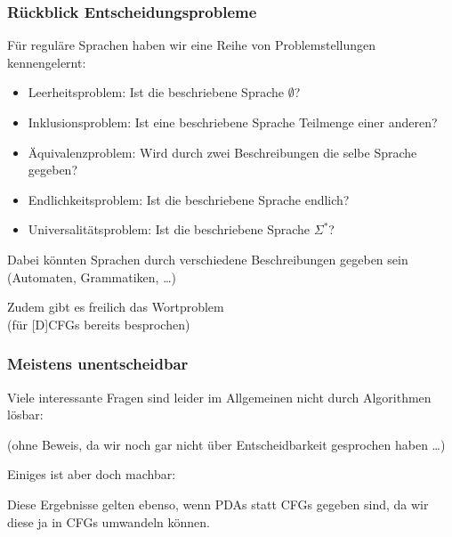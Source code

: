 \documentclass[onlymath]{beamer}
\begin{document}
% 
% 


\begin{frame}\frametitle{Rückblick Entscheidungsprobleme}

Für reguläre Sprachen haben wir eine Reihe von Problemstellungen kennengelernt:
\begin{itemize}
\item \alert{Leerheitsproblem:} Ist die beschriebene Sprache $\emptyset$?
\item \alert{Inklusionsproblem:} Ist eine beschriebene Sprache Teilmenge einer anderen?
\item \alert{Äquivalenzproblem:} Wird durch zwei Beschreibungen die selbe Sprache gegeben?
\item \alert{Endlichkeitsproblem:} Ist die beschriebene Sprache endlich?
\item \alert{Universalitätsproblem:} Ist die beschriebene Sprache $\Sigma^*$?
\end{itemize}

Dabei könnten Sprachen durch verschiedene Beschreibungen gegeben sein (Automaten, Grammatiken, \ldots)
\medskip

\footnotesize
\textcolor{devilscss}{Zudem gibt es freilich das Wortproblem\\ (für [D]CFGs bereits besprochen)}

\end{frame}

\begin{frame}\frametitle{Meistens unentscheidbar}

Viele interessante Fragen sind leider im Allgemeinen nicht durch Algorithmen lösbar:\medskip


(ohne Beweis, da wir noch gar nicht über Entscheidbarkeit gesprochen haben \ldots)
\medskip\pause

Einiges ist aber doch machbar:

\medskip

Diese Ergebnisse gelten ebenso, wenn PDAs statt CFGs gegeben sind, da wir diese ja in CFGs umwandeln können.

\end{frame}
\end{document}
